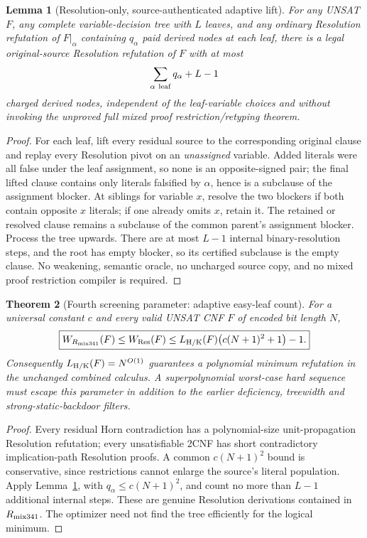 \documentclass[11pt]{article}
\newtheorem{theorem}{Theorem}
\newtheorem{lemma}[theorem]{Lemma}
\begin{document}
\begin{lemma}[Resolution-only, source-authenticated adaptive lift]\label{lift}
For any UNSAT \(F\), any complete variable-decision tree with \(L\) leaves, and any ordinary Resolution refutation of \(F|_{\alpha}\) containing \(q_{\alpha}\) paid derived nodes at each leaf, there is a legal original-source Resolution refutation of \(F\) with at most
\[
\sum_{\alpha\ {\rm leaf}}q_{\alpha}+L-1
\]
charged derived nodes, independent of the leaf-variable choices and without invoking the unproved full mixed proof restriction/retyping theorem.
\end{lemma}
\begin{proof}
For each leaf, lift every residual source to the corresponding original clause and replay every Resolution pivot on an \emph{unassigned} variable. Added literals were all false under the leaf assignment, so none is an opposite-signed pair; the final lifted clause contains only literals falsified by \(\alpha\), hence is a subclause of the assignment blocker. At siblings for variable \(x\), resolve the two blockers if both contain opposite \(x\) literals; if one already omits \(x\), retain it. The retained or resolved clause remains a subclause of the common parent's assignment blocker. Process the tree upwards. There are at most \(L-1\) internal binary-resolution steps, and the root has empty blocker, so its certified subclause is the empty clause. No weakening, semantic oracle, no uncharged source copy, and no mixed proof restriction compiler is required.
\end{proof}

\begin{theorem}[Fourth screening parameter: adaptive easy-leaf count]\label{screen}
For a universal constant \(c\) and every valid UNSAT CNF \(F\) of encoded bit length \(N\),
\[
\boxed{W_{R_{\rm mix341}}(F)\le W_{\rm Res}(F)
\le L_{\rm H/K}(F)\bigl(c(N+1)^2+1\bigr)-1.}
\]
Consequently \(L_{\rm H/K}(F)=N^{O(1)}\) guarantees a polynomial minimum refutation in the unchanged combined calculus. A superpolynomial worst-case hard sequence must escape this parameter in addition to the earlier deficiency, treewidth and strong-static-backdoor filters.
\end{theorem}
\begin{proof}
Every residual Horn contradiction has a polynomial-size unit-propagation Resolution refutation; every unsatisfiable 2CNF has short contradictory implication-path Resolution proofs. A common \(c(N+1)^2\) bound is conservative, since restrictions cannot enlarge the source's literal population. Apply Lemma~\ref{lift}, with \(q_\alpha\le c(N+1)^2\), and count no more than \(L-1\) additional internal steps. These are genuine Resolution derivations contained in \(R_{\rm mix341}\). The optimizer need not find the tree efficiently for the logical minimum.
\end{proof}
\end{document}
